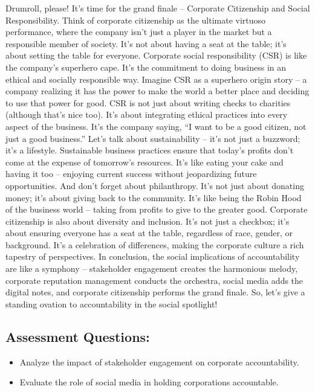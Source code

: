 \documentclass[
  letterpaper,
  DIV=11,
  numbers=noendperiod]{scrreprt}
\begin{document}
Drumroll, please! It's time for the grand finale -- Corporate
Citizenship and Social Responsibility. Think of corporate citizenship as
the ultimate virtuoso performance, where the company isn't just a player
in the market but a responsible member of society. It's not about having
a seat at the table; it's about setting the table for everyone.
Corporate social responsibility (CSR) is like the company's superhero
cape. It's the commitment to doing business in an ethical and socially
responsible way. Imagine CSR as a superhero origin story -- a company
realizing it has the power to make the world a better place and deciding
to use that power for good. CSR is not just about writing checks to
charities (although that's nice too). It's about integrating ethical
practices into every aspect of the business. It's the company saying,
``I want to be a good citizen, not just a good business.'' Let's talk
about sustainability -- it's not just a buzzword; it's a lifestyle.
Sustainable business practices ensure that today's profits don't come at
the expense of tomorrow's resources. It's like eating your cake and
having it too -- enjoying current success without jeopardizing future
opportunities. And don't forget about philanthropy. It's not just about
donating money; it's about giving back to the community. It's like being
the Robin Hood of the business world -- taking from profits to give to
the greater good. Corporate citizenship is also about diversity and
inclusion. It's not just a checkbox; it's about ensuring everyone has a
seat at the table, regardless of race, gender, or background. It's a
celebration of differences, making the corporate culture a rich tapestry
of perspectives. In conclusion, the social implications of
accountability are like a symphony -- stakeholder engagement creates the
harmonious melody, corporate reputation management conducts the
orchestra, social media adds the digital notes, and corporate
citizenship performs the grand finale. So, let's give a standing ovation
to accountability in the social spotlight!

\subsection{Assessment Questions:}\label{assessment-questions-4}

\begin{itemize}
\item
  Analyze the impact of stakeholder engagement on corporate
  accountability.
\item
  Evaluate the role of social media in holding corporations accountable.
\end{itemize}
\end{document}
